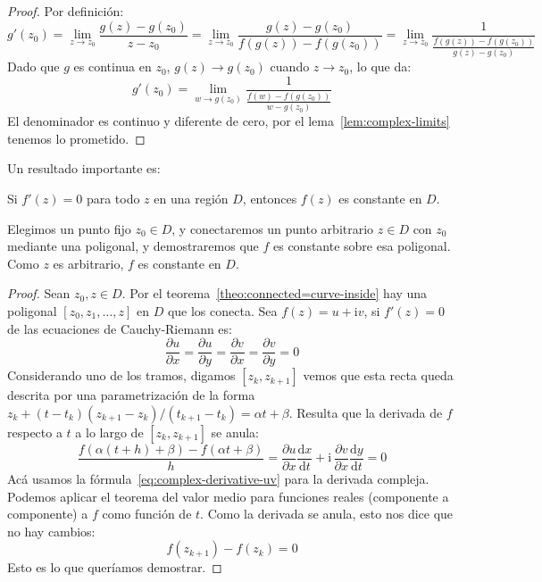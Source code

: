   \begin{proof}
    Por definición:
    \begin{equation*}
      g'(z_0)
	= \lim_{z \rightarrow z_0} \frac{g(z) - g(z_0)}{z - z_0}
	= \lim_{z \rightarrow z_0}
	    \frac{g(z) - g(z_0)}{f(g(z)) - f(g(z_0))}
	= \lim_{z \rightarrow z_0}
	    \frac{1}{\frac{f(g(z)) - f(g(z_0))}{g(z) - g(z_0)}}
    \end{equation*}
    Dado que \(g\) es continua en \(z_0\),
    \(g(z) \rightarrow g(z_0)\) cuando \(z \rightarrow z_0\),
    lo que da:
    \begin{equation*}
      g'(z_0)
	= \lim_{w \rightarrow g(z_0)}
	    \frac{1}{\frac{f(w) - f(g(z_0))}{w - g(z_0)}}
    \end{equation*}
    El denominador es continuo y diferente de cero,
    por el lema~\ref{lem:complex-limits} tenemos lo prometido.
  \end{proof}
  Un resultado importante es:
  \begin{theorem}
    \label{theo:complex-zero-derivative}
    Si \(f'(z) = 0\) para todo \(z\) en una región \(D\),
    entonces \(f(z)\) es constante en \(D\).
  \end{theorem}
  Elegimos un punto fijo \(z_0 \in D\),
  y conectaremos un punto arbitrario \(z \in D\) con \(z_0\)
  mediante una poligonal,
  y demostraremos que \(f\) es constante sobre esa poligonal.
  Como \(z\) es arbitrario,
  \(f\) es constante en \(D\).
  \begin{proof}
    Sean \(z_0, z \in D\).
    Por el teorema~\ref{theo:connected=curve-inside}
    hay una poligonal \([z_0, z_1, \dotsc, z]\) en \(D\)
    que los conecta.
    Sea \(f(z) = u + \mathrm{i} v\),
    si \(f'(z) = 0\) de las ecuaciones de Cauchy-Riemann
    es:
    \begin{equation*}
      \frac{\partial u}{\partial x}
	= \frac{\partial u}{\partial y}
	= \frac{\partial v}{\partial x}
	= \frac{\partial v}{\partial y}
	= 0
    \end{equation*}
    Considerando uno de los tramos,
    digamos \([z_k, z_{k + 1}]\)
    vemos que esta recta
    queda descrita por una parametrización de la forma
    \(z_k + (t - t_k) (z_{k + 1} - z_k) / (t_{k + 1} - t_k)
       = \alpha t + \beta\).
    Resulta que la derivada de \(f\) respecto a \(t\)
    a lo largo de \([z_k, z_{k + 1}]\)
    se anula:
    \begin{equation*}
      \frac{f(\alpha (t + h) + \beta)
	     - f(\alpha t + \beta)}
	   {h}
	= \frac{\partial u}{\partial x}
	     \frac{\mathrm{d} x}{\mathrm{d} t}
	     + \mathrm{i} \,
		 \frac{\partial v}{\partial x}
		 \frac{\mathrm{d} y}{\mathrm{d} t}
	= 0
    \end{equation*}
    Acá usamos la fórmula~\eqref{eq:complex-derivative-uv}
    para la derivada compleja.
    Podemos aplicar el teorema del valor medio para funciones reales
    (componente a componente)
    a \(f\) como función de \(t\).
    Como la derivada se anula,
    esto nos dice que no hay cambios:
    \begin{equation*}
      f(z_{k + 1}) - f(z_k)
	= 0
    \end{equation*}
    Esto es lo que queríamos demostrar.
  \end{proof}

